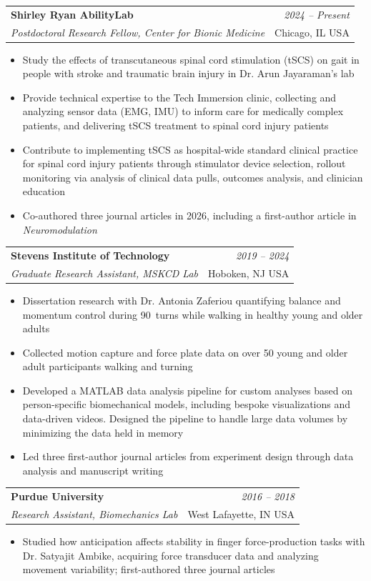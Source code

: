 \documentclass[letterpaper,11pt]{article}
\makeatletter
\newcommand{\resumeSubheading}[4]{
\vspace{0.5mm}\item
    \begin{tabular*}{0.98\textwidth}[t]{l@{\extracolsep{\fill}}r}
        \textbf{#1} & \textit{\footnotesize{#4}} \\
        \textit{\footnotesize{#3}} &  \footnotesize{#2}\\
    \end{tabular*}
    \vspace{-2.4mm}
}
\newcommand{\resumeItemListStart}{\begin{itemize}[leftmargin=*,labelsep=1mm,itemsep=0.5mm]}
\newcommand{\resumeItemListEnd}{\end{itemize}\vspace{-2mm}}
\makeatother
\begin{document}
\resumeSubheading
  {Shirley Ryan AbilityLab}{Chicago, IL USA}
  {Postdoctoral Research Fellow, Center for Bionic Medicine}{2024 -- Present}
\resumeItemListStart
  \item Study the effects of transcutaneous spinal cord stimulation (tSCS) on gait in people with stroke and traumatic brain injury in Dr. Arun Jayaraman's lab
  \item Provide technical expertise to the Tech Immersion clinic, collecting and analyzing sensor data (EMG, IMU) to inform care for medically complex patients, and delivering tSCS treatment to spinal cord injury patients
  \item Contribute to implementing tSCS as hospital-wide standard clinical practice for spinal cord injury patients through stimulator device selection, rollout monitoring via analysis of clinical data pulls, outcomes analysis, and clinician education
  \item Co-authored three journal articles in 2026, including a first-author article in \textit{Neuromodulation}
\resumeItemListEnd

\resumeSubheading
  {Stevens Institute of Technology}{Hoboken, NJ USA}
  {Graduate Research Assistant, MSKCD Lab}{2019 -- 2024}
\resumeItemListStart
  \item Dissertation research with Dr. Antonia Zaferiou quantifying balance and momentum control during 90\degree~turns while walking in healthy young and older adults
  \item Collected motion capture and force plate data on over 50 young and older adult participants walking and turning
  \item Developed a MATLAB data analysis pipeline for custom analyses based on person-specific biomechanical models, including bespoke visualizations and data-driven videos. Designed the pipeline to handle large data volumes by minimizing the data held in memory
  \item Led three first-author journal articles from experiment design through data analysis and manuscript writing
\resumeItemListEnd

\resumeSubheading
  {Purdue University}{West Lafayette, IN USA}
  {Research Assistant, Biomechanics Lab}{2016 -- 2018}
\resumeItemListStart
  \item Studied how anticipation affects stability in finger force-production tasks with Dr. Satyajit Ambike, acquiring force transducer data and analyzing movement variability; first-authored three journal articles
\resumeItemListEnd
\end{document}

